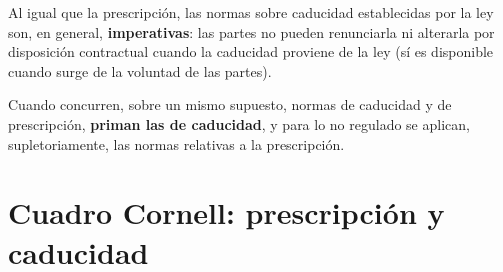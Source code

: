 \documentclass[12pt,oneside]{book}
\begin{document}
Al igual que la prescripción, las normas sobre caducidad establecidas por la ley son, en general, \textbf{imperativas}: las partes no pueden renunciarla ni alterarla por disposición contractual cuando la caducidad proviene de la ley (sí es disponible cuando surge de la voluntad de las partes). %

Cuando concurren, sobre un mismo supuesto, normas de caducidad y de prescripción, \textbf{priman las de caducidad}, y para lo no regulado se aplican, supletoriamente, las normas relativas a la prescripción.

\section{Cuadro Cornell: prescripción y caducidad}
\end{document}
